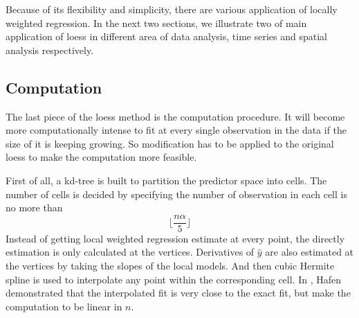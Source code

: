 Because of its flexibility and simplicity, there are various
application of locally weighted regression. In the next two sections, we illustrate
two of main application of loess in different area of data analysis, time series
and spatial analysis respectively.

\subsection{Computation}

The last piece of the loess method is the computation procedure. It will become
more computationally intense to fit at every single observation in the data if 
the size of it is keeping growing. So modification has to be applied to the 
original loess to make the computation more feasible. 

First of all, a kd-tree \cite{friedman1977algorithm} is built to partition the 
predictor space into cells. The number of cells is decided by specifying the 
number of observation in each cell is no more than 
\begin{equation} 
\lfloor\frac{n\alpha}{5}\rfloor
\end{equation} 
Instead of getting local weighted regression estimate at every point,
the directly estimation is only calculated at the vertices. Derivatives of 
$\hat y$ are also estimated at the vertices by taking the slopes of the local 
models. And then cubic Hermite spline is used to interpolate any point within the
corresponding cell.
In \cite{hafen2010local}, Hafen demonstrated that the interpolated fit is very 
close to the exact fit, but make the computation to be linear in $n$.
